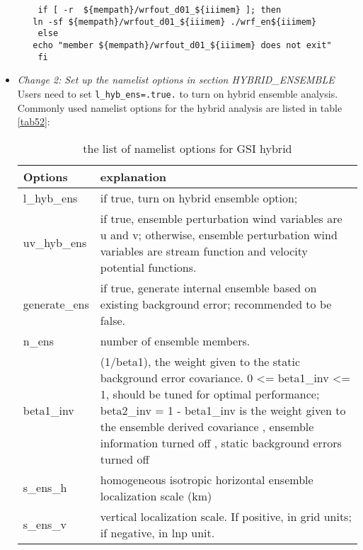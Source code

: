 \begin{itemize}[leftmargin=*]
\begin{scriptsize}
\begin{verbatim}
	if [ -r  ${mempath}/wrfout_d01_${iiimem} ]; then
   ln -sf ${mempath}/wrfout_d01_${iiimem} ./wrf_en${iiimem}
	else
   echo "member ${mempath}/wrfout_d01_${iiimem} does not exit"
	fi
\end{verbatim}
\end{scriptsize}

\item \textit{Change 2: Set up the namelist options in section HYBRID\_ENSEMBLE}\\

Users need to set \verb|l_hyb_ens=.true.| to turn on hybrid ensemble analysis. Commonly used namelist options for the hybrid analysis are listed in table \ref{tab52}:

\begin{table}[htbp]
\centering
\caption{the list of namelist options for GSI hybrid}
\begin{tabular}{|p{3cm}|p{11cm}|}
\hline
Options &  explanation \\
\hline
l\_hyb\_ens &  if true, turn on hybrid ensemble option; \\
\hline
uv\_hyb\_ens & if true, ensemble perturbation wind variables are u and v; \newline
otherwise, ensemble perturbation wind variables are stream function and velocity potential functions. \\
\hline
generate\_ens &  if true, generate internal ensemble based on existing background error; recommended to be false. \\
\hline
n\_ens &  number of ensemble members. \\
\hline
beta1\_inv& (1/beta1), the weight given to the static background error covariance. 0 <= beta1\_inv <= 1, should be tuned for optimal performance; beta2\_inv = 1 - beta1\_inv is the weight given to the ensemble derived covariance \newline
=1, ensemble information turned off \newline
=0, static background errors turned off \\
\hline
s\_ens\_h & homogeneous isotropic horizontal ensemble localization scale (km) \\
\hline
s\_ens\_v &  vertical localization scale. \newline
If positive, in grid units; \newline
if negative, in lnp unit. \\
\hline

\end{tabular}
\end{table}
\end{itemize}
